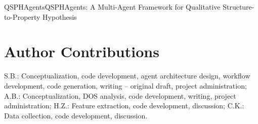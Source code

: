 \begin{teamsubmission}{QSPHAgents}{QSPHAgents: A Multi-Agent Framework for Qualitative Structure-to-Property Hypothesis}
\section*{Author Contributions}

S.B.: Conceptualization, code development, agent architecture design, workflow development, code generation, writing – original draft, project administration; A.B.: Conceptualization, DOS analysis, code development, writing, project administration; H.Z.: Feature extraction, code development, discussion; C.K.: Data collection, code development, discussion.
\end{teamsubmission}




